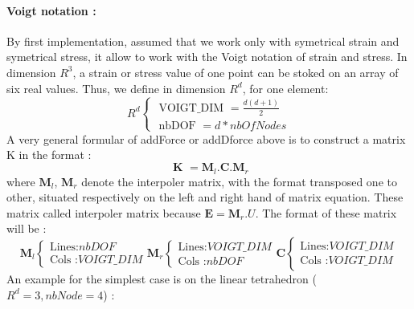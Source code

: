 \documentclass[a4paper,10pt]{article}
\begin{document}
\paragraph{Voigt notation :} By first implementation, assumed that we work only with symetrical strain and symetrical stress, it allow to work with the Voigt notation of strain and stress. In dimension $R^3$, a strain or stress value of one point can be stoked on an array of six real values. Thus, we define in dimension $R^d$, for one element:
\[
R^d
\left\{ 
\begin{array}{l}
 \text{ VOIGT\_DIM }   = \frac{d(d+1)}{2} \\
 \text{ nbDOF      }   = d*nbOfNodes  
\end{array}\right.
\]
A very general formular of addForce or addDforce above is to construct a matrix K in the format : 
\[
 \textbf{ K }   = \textbf{M}_l  . \textbf{C} . \textbf{M}_r
\]
where $\textbf{M}_l$, $\textbf{M}_r$ denote the interpoler matrix, with the format transposed one to other, situated respectively on the left and right hand of matrix equation. These matrix called interpoler matrix because $\textbf{E}=\textbf{M}_r.U$. The format of these matrix will be :
\[
\textbf{M}_l 
\left\{ 
\begin{array}{l}
\text{Lines:}       nbDOF        \\
\text{Cols :}       VOIGT\_DIM
\end{array}\right.
\textbf{M}_r 
\left\{ 
\begin{array}{l}
\text{Lines:}       VOIGT\_DIM  \\
\text{Cols :}       nbDOF
\end{array}\right.
\textbf{C} 
\left\{ 
\begin{array}{l}
\text{Lines:}       VOIGT\_DIM \\
\text{Cols :}       VOIGT\_DIM
\end{array}\right.
\]
An example for the simplest case is on the linear tetrahedron ($R^d=3, nbNode=4$) :
\end{document}
